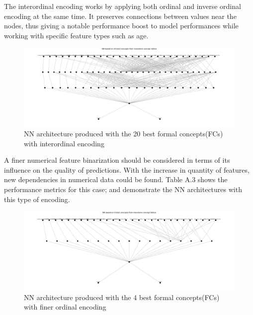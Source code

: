 \documentclass[14pt,a4paper]{extarticle}
\begin{document}
	The interordinal encoding works by applying both ordinal and inverse ordinal encoding at the same time. It preserves connections between values near the nodes, thus giving a notable performance boost to model performances while working with specific feature types such as age.
	
	\newpage
	
	\begin{figure}[h]
		\centering
		\includegraphics[width=\textwidth]{media/employees/NN_architecture_20concepts.png}
		\caption{NN architecture produced with the 20 best formal concepts(FCs) with interordinal encoding}
		\label{fig:20concepts-inter}
	\end{figure}
	
	 A finer numerical feature binarization should be considered in terms of its influence on the quality of predictions. With the increase in quantity of features, new dependencies in numerical data could be found. Table A.3 shows the performance metrics for this case;  and  demonstrate the NN architectures with this type of encoding.
	
	\begin{figure}[h]
		\centering
		\includegraphics[width=\textwidth]{media/employees/NN_architecture_4concepts.png}
		\caption{NN architecture produced with the 4 best formal concepts(FCs) with finer ordinal encoding}
		\label{fig:4concepts-coarse}
	\end{figure}
	
	\newpage
	
\end{document}
